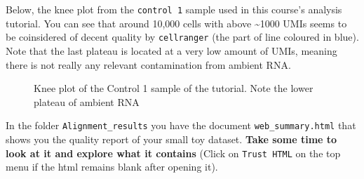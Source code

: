 \documentclass[
  letterpaper,
  DIV=11,
  numbers=noendperiod]{scrartcl}
\begin{document}
Below, the knee plot from the \texttt{control\ 1} sample used in this
course's analysis tutorial. You can see that around 10,000 cells with
above \textasciitilde1000 UMIs seems to be coinsidered of decent quality
by \texttt{cellranger} (the part of line coloured in blue). Note that
the last plateau is located at a very low amount of UMIs, meaning there
is not really any relevant contamination from ambient RNA.

\begin{figure}


\caption{\label{fig-knee}Knee plot of the Control 1 sample of the
tutorial. Note the lower plateau of ambient RNA}

\end{figure}%

\begin{tcolorbox}[enhanced jigsaw, colbacktitle=quarto-callout-note-color!10!white, left=2mm, breakable, bottomtitle=1mm, colframe=quarto-callout-note-color-frame, opacityback=0, opacitybacktitle=0.6, toprule=.15mm, colback=white, toptitle=1mm, titlerule=0mm, arc=.35mm, title={Exercise}, bottomrule=.15mm, rightrule=.15mm, leftrule=.75mm, coltitle=black]

In the folder \texttt{Alignment\_results} you have the document
\texttt{web\_summary.html} that shows you the quality report of your
small toy dataset. \textbf{Take some time to look at it and explore what
it contains} (Click on \texttt{Trust\ HTML} on the top menu if the html
remains blank after opening it).

\end{tcolorbox}
\end{document}
